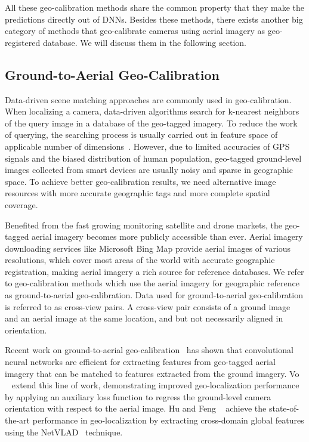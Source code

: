 All these geo-calibration methods share the common property that they
make the predictions directly out of DNNs. Besides these methods,
there exists another big category of methods that geo-calibrate
cameras using aerial imagery as geo-registered database. We will
discuss them in the following section.

\subsection{Ground-to-Aerial Geo-Calibration}
Data-driven scene matching approaches are commonly used in
geo-calibration.
When localizing a camera, data-driven algorithms search for k-nearest
neighbors of the query image in a database of the geo-tagged imagery.
To reduce the work of querying, the searching process is usually
carried out in feature space of applicable number of  
dimensions~\cite{im2gps, li2010location,zamir2010accurate}.
However, due to limited accuracies of GPS signals and the biased
distribution of human population, geo-tagged ground-level images
collected from smart devices are usually noisy and sparse in
geographic space. To achieve better geo-calibration results, we
need alternative image resources with more accurate geographic tags
and more complete spatial coverage.

Benefited from the fast growing monitoring satellite and drone markets,
the geo-tagged aerial imagery becomes more publicly accessible
than ever. Aerial imagery downloading services like
Microsoft Bing Map provide aerial images of various
resolutions, which cover most areas of the world with accurate
geographic registration, making aerial imagery a rich source for
reference databases. We refer to geo-calibration
methods which use the aerial imagery for geographic reference as
ground-to-aerial geo-calibration. Data used for ground-to-aerial
geo-calibration is referred to as cross-view pairs.
A cross-view pair consists of a ground image and an aerial image at
the same location, and but not necessarily aligned in orientation.

Recent work on ground-to-aerial
geo-calibration~\cite{lin2013cross,lin2015learning,workman2015geocnn,workman2015wide}
has shown that convolutional neural networks are efficient for extracting
features from geo-tagged aerial imagery that can be matched to
features extracted from the ground imagery.  Vo
\etal~\cite{vo2016localizing} extend this line of work, demonstrating
improved geo-localization performance by applying an auxiliary loss
function to regress the ground-level camera orientation with respect
to the aerial image. Hu and Feng \etal~\cite{mh2018cvm} achieve the
state-of-the-art performance in geo-localization by extracting
cross-domain global features using the
NetVLAD~\cite{arandjelovic2016netvlad} technique.

